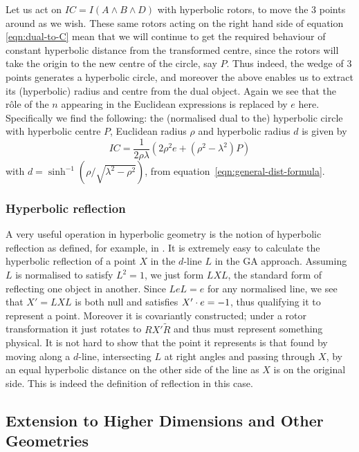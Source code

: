 %
Let us act on $IC=I(A \wedge B \wedge D)$ with hyperbolic rotors,
to move the 3 points around as we wish. These same rotors acting
on the right hand side of equation \ref{eqn:dual-to-C} mean that we will
continue to get the required behaviour of constant hyperbolic
distance from the transformed centre, since the rotors will take
the origin to the new centre of the circle, say $P$. Thus indeed,
the wedge of 3 points generates a hyperbolic circle, and
moreover the above enables us to extract its (hyperbolic)
radius and centre from the dual object. Again we see that the
r\^ole of the $n$ appearing in the Euclidean expressions is
replaced by $e$ here. Specifically we find the following: the
(normalised dual to the) hyperbolic circle with hyperbolic
centre $P$, Euclidean radius $\rho$ and hyperbolic radius $d$
is given by
%
\begin{equation}\label{eqn:non-e-circle}
IC = \frac{1}{2 \rho \lambda} \left( 2 \rho^2 e +
(\rho^2-\lambda^2) P \right)
\end{equation}
%
with $d= \sinh^{-1} (\rho/\sqrt{\lambda^2-\rho^2})$, from
equation~\ref{eqn:general-dist-formula}.

\subsubsection{Hyperbolic reflection}

A very useful operation in hyperbolic geometry is the notion of
hyperbolic reflection as defined, for example, in \cite{brannan}. 
It is extremely easy to calculate the hyperbolic
reflection of a point $X$ in the $d$-line $L$ in the GA approach.
Assuming $L$ is normalised to satisfy $L^2=1$, we just form $LXL$,
the standard form of reflecting one object in another. Since $L e
L = e$ for any normalised line, we see that $X'=LXL$ is both
null and satisfies $X' \cdot e=-1$, thus qualifying it to represent a
point. Moreover it is covariantly constructed;
under a rotor transformation it just rotates to $R X'
\tilde{R}$ and thus must represent something physical. It is not
hard to show that the point it represents is that found by moving
along a $d$-line, intersecting $L$ at right angles and passing
through $X$, by an equal hyperbolic distance on the other side
of the line as $X$ is on the original side. This is indeed the
definition of reflection in this case.

\subsection{Extension to Higher Dimensions and Other Geometries}


